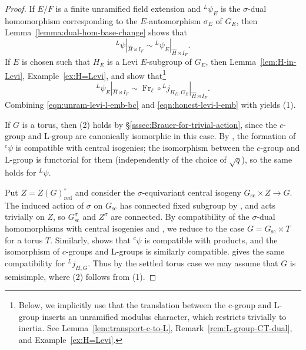 \documentclass[reqno]{amsart}
\numberwithin{equation}{subsection}
\newcommand{\wh}[1]{\widehat{#1}}
\newcommand{\ld}{{}^L}
\newcommand{\lc}{{}^c}
\DeclareMathOperator{\red}{red}
\DeclareMathOperator{\Fr}{Fr}
\theoremstyle{remark}
\numberwithin{equation}{subsection}
\numberwithin{figure}{subsection}
\begin{document}
\begin{proof}
If $E/F$ is a finite unramified field extension and $\ld\psi_E$ is the $\sigma$-dual homomorphism corresponding to the $E$-automorphism $\sigma_E$ of $G_E$, then Lemma~\ref{lemma:dual-hom-base-change} shows that
\begin{equation}\label{eqn:unram-levi-l-emb-bc}
    \ld\psi|_{\wh H \rtimes I_F} \sim \ld\psi_E|_{\wh H \rtimes I_F}.
\end{equation}
If $E$ is chosen such that $H_E$ is a Levi $E$-subgroup of $G_E$, then Lemma~\ref{lem:H-in-Levi}, Example~\ref{ex:H=Levi}, and \cite[Lemma~4.5.2(1)]{CF26a} show that\footnote{Below, we implicitly use that the translation between the c-group and L-group inserts an unramified modulus character, which restricts trivially to inertia. See Lemma~\ref{lem:transport-c-to-L}, Remark~\ref{rem:L-group-CT-dual}, and Example~\ref{ex:H=Levi}.}
\begin{equation}\label{eqn:honest-levi-l-emb}
    \ld\psi_E|_{\wh H \rtimes I_F} \sim \Fr_\ell \circ \ld j_{H_E, G_E}|_{\wh H \rtimes I_F}.
\end{equation}
Combining \eqref{eqn:unram-levi-l-emb-bc} and \eqref{eqn:honest-levi-l-emb} with \cite[Lemma~5.2.2]{CF26a} yields (1).

If $G$ is a torus, then (2) holds by \S\ref{sssec:Brauer-for-trivial-action}, since the $c$-group and L-group are canonically isomorphic in this case. By \cite[\S 5.6.3]{F24}, the formation of $\lc\psi$ is compatible with central isogenies; the isomorphism between the $c$-group and L-group is functorial for them (independently of the choice of $\sqrt{q}$), so the same holds for $\ld\psi$. 

Put $Z=Z(G)^\circ_{\red}$ and consider the $\sigma$-equivariant central isogeny $G_{\mathrm{sc}}\times Z\to G$. The induced action of $\sigma$ on $G_{\mathrm{sc}}$ has connected fixed subgroup by \cite[Theorem 8.1]{St68}, and acts trivially on $Z$, so $G_{\mathrm{sc}}^\sigma$ and $Z^\sigma$ are connected. By compatibility of the $\sigma$-dual homomorphisms with central isogenies and \cite[Lemma~4.5.2(2)]{CF26a}, we reduce to the case $G=G_{\mathrm{sc}}\times T$ for a torus $T$. Similarly, \cite[\S 5.6.2]{F24} shows that $\lc\psi$ is compatible with products, and the isomorphism of $c$-groups and L-groups is similarly compatible. \cite[Lemma~4.5.2(3)]{CF26a} gives the same compatibility for $\ld j_{H,G}$. Thus by the settled torus case we may assume that $G$ is semisimple, where (2) follows from (1).


\end{proof}
\end{document}
